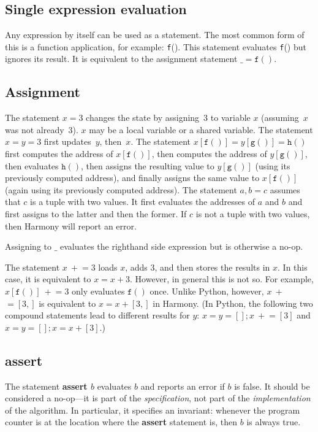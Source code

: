 \documentclass{report}
\begin{document}
\subsection*{Single expression evaluation}

Any expression by itself can be used as a statement.  The most common
form of this is a function application, for example: \texttt{f}().
This statement evaluates \texttt{f}() but ignores its result.
It is equivalent to the assignment statement $\_ = \mathtt{f}()$.

\subsection*{Assignment}

The statement $x = 3$ changes the state by assigning~3 to
variable $x$ (assuming~$x$ was not already~3).
$x$ may be a local variable or a shared variable.
The statement $x = y = 3$ first updates~$y$, then~$x$.
The statement $x[\mathtt{f}()] = y[\mathtt{g}()] = \mathtt{h}()$ first computes
the address of $x[\mathtt{f}()]$, then computes the address of
$y[\mathtt{g}()]$, then evaluates $\mathtt{h}()$, then assigns the resulting value to $y[\mathtt{g}()]$ (using its previously computed address), and finally assigns the same value to $x[\mathtt{f}()]$ (again using its previously computed address).
The statement $a,b = c$ assumes that $c$ is a tuple with two values.
It first evaluates the addresses of $a$ and $b$ and first assigns to
the latter and then the former.
If $c$ is not a tuple with two values, then Harmony will report an error.

Assigning to $\_$ evaluates the righthand side expression but is otherwise
a no-op.

The statement $x~+$$= 3$ loads $x$, adds 3, and then stores the
results in $x$.  In this case, it is equivalent to $x = x + 3$.
However, in general this is not so.  For example, $x[\mathtt{f}()]~+$$= 3$
only evaluates $\mathtt{f}()$ once.  Unlike Python, however,
$x~+$$= [3,]$ is equivalent to $x = x + [3,]$ in Harmony.
(In Python, the following two compound statements lead to different results
for $y$: $x = y = []; x~+$$= [3]$ and $x = y = []; x = x + [3]$.)

\subsection*{\textbf{assert}}

The statement \textbf{assert $b$} evaluates $b$ and reports an error
if $b$ is false.  It should be considered a no-op---it is part of the
\emph{specification}, not part of the \emph{implementation} of the algorithm.
In particular, it specifies an invariant: whenever the program counter is
at the location where the \textbf{assert} statement is, then $b$ is
always true.
\end{document}
